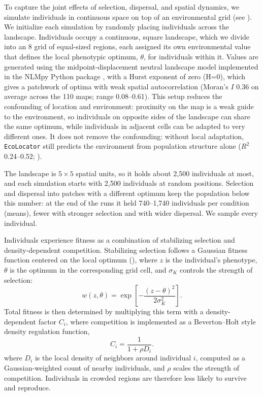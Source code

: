 \documentclass[]{article}
\newcommand{\ecolocator}{\texttt{EcoLocator}\xspace}
\providecommand{\llabel}[1]{}%
\begin{document}
To capture the joint effects of selection, dispersal,
and spatial dynamics,
we simulate individuals in continuous space
on top of an environmental grid (see ).
We initialize each simulation
by randomly placing individuals across the landscape.
Individuals occupy a continuous, square landscape, 
which we divide into an 8 grid of equal-sized regions, 
each assigned its own environmental value that defines the local phenotypic optimum, 
$\theta$, for individuals within it.
Values are generated using the midpoint-displacement neutral landscape model 
implemented in the NLMpy Python package \citep{etherington_nlmpy_2015},
with a Hurst exponent of zero (H=0),
which gives a patchwork of optima
with weak spatial autocorrelation
(Moran's $I$ 0.36 on average across the 110 maps; range 0.08--0.61).
This setup reduces the confounding of location and environment:
proximity on the map is a weak guide to the environment,
so individuals on opposite sides of the landscape can share
the same optimum, while individuals in adjacent
cells can be adapted to very different ones.
It does not remove the confounding:
without local adaptation, \ecolocator still predicts the environment
from population structure alone ($R^2$ 0.24--0.52; ).

The landscape is $5 \times 5$ spatial units,
so it holds about 2,500 individuals at most,
and each simulation starts with 2,500 individuals at random positions.
Selection and dispersal into patches with a different optimum
keep the population below this number:\llabel{simpopsize}
at the end of the runs it held 740--1,740 individuals
per condition (means),
fewer with stronger selection and with wider dispersal.
We sample every individual.

Individuals experience fitness as a combination
of stabilizing selection and density-dependent competition.
Stabilizing selection follows a Gaussian fitness function
centered on the local optimum (),
where $z$ is the individual's phenotype,
$\theta$ is the optimum in the corresponding grid cell,
and $\sigma_K$ controls the strength of selection:
\begin{equation}
w(z, \theta) = \exp\!\left[-\frac{(z - \theta)^2}{2\sigma_K^2}\right].
\label{eq:stabsel}
\end{equation}
Total fitness is then determined by multiplying this term
with a density-dependent factor $C_i$,
where competition is implemented
as a Beverton--Holt style density regulation function,
\begin{equation}
C_i = \frac{1}{1 + \rho D_i}.
\label{eq:comp}
\end{equation}
where $D_i$ is the local density of neighbors 
around individual $i$, computed as a 
Gaussian-weighted count of nearby individuals, 
and $\rho$ scales the strength of competition. 
Individuals in crowded regions are therefore less 
likely to survive and reproduce.
\end{document}
